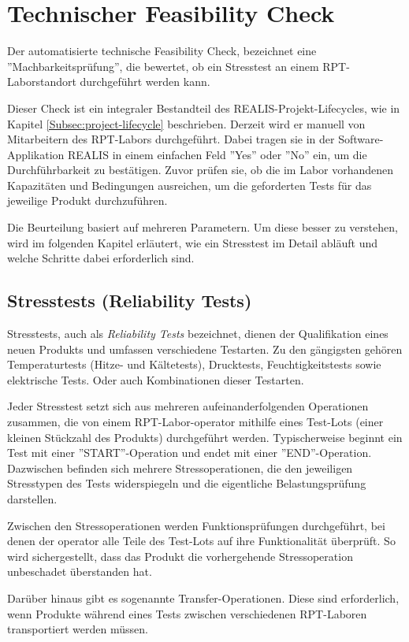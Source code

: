\section{Technischer Feasibility Check}
Der automatisierte technische Feasibility Check, bezeichnet eine ''Machbarkeitsprüfung'', die bewertet, ob ein Stresstest an einem \ac{RPT}-Laborstandort durchgeführt werden kann.

Dieser Check ist ein integraler Bestandteil des \ac{REALIS}-Projekt-Lifecycles, wie in Kapitel \ref{Subsec:project-lifecycle} beschrieben. Derzeit wird er manuell von Mitarbeitern des \ac{RPT}-Labors durchgeführt. Dabei tragen sie in der Software-Applikation \ac{REALIS} in einem einfachen Feld ''Yes'' oder ''No'' ein, um die Durchführbarkeit zu bestätigen. Zuvor prüfen sie, ob die im Labor vorhandenen Kapazitäten und Bedingungen ausreichen, um die geforderten Tests für das jeweilige Produkt durchzuführen.

Die Beurteilung basiert auf mehreren Parametern. Um diese besser zu verstehen, wird im folgenden Kapitel erläutert, wie ein Stresstest im Detail abläuft und welche Schritte dabei erforderlich sind.


\subsection{Stresstests (Reliability Tests)}

Stresstests, auch als \textit{Reliability Tests} bezeichnet, dienen der Qualifikation eines neuen Produkts und umfassen verschiedene Testarten. Zu den gängigsten gehören Temperaturtests (Hitze- und Kältetests), Drucktests, Feuchtigkeitstests sowie elektrische Tests. Oder auch Kombinationen dieser Testarten.

Jeder Stresstest setzt sich aus mehreren aufeinanderfolgenden Operationen zusammen, die von einem \ac{RPT}-Labor-\gls{operator} mithilfe eines Test-Lots (einer kleinen Stückzahl des Produkts) durchgeführt werden. Typischerweise beginnt ein Test mit einer ''START''-Operation und endet mit einer ''END''-Operation. Dazwischen befinden sich mehrere Stressoperationen, die den jeweiligen Stresstypen des Tests widerspiegeln und die eigentliche Belastungsprüfung darstellen.

Zwischen den Stressoperationen werden Funktionsprüfungen durchgeführt, bei denen der \gls{operator} alle Teile des Test-Lots auf ihre Funktionalität überprüft. So wird sichergestellt, dass das Produkt die vorhergehende Stressoperation unbeschadet überstanden hat.

Darüber hinaus gibt es sogenannte Transfer-Operationen. Diese sind erforderlich, wenn Produkte während eines Tests zwischen verschiedenen \ac{RPT}-Laboren transportiert werden müssen.
